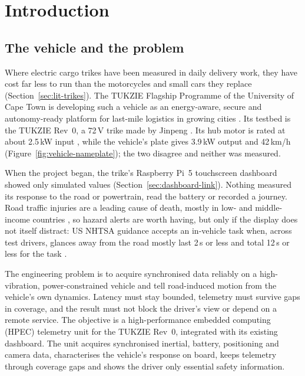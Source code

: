 \chapter{Introduction}
\label{chap:intro}

\section{The vehicle and the problem}

Where electric cargo trikes have been measured in daily delivery work, they have cost far less to run than the motorcycles and small cars they replace (Section~\ref{sec:lit-trikes}). The TUKZIE Flagship Programme of the University of Cape Town \cite{tukzie2026web} is developing such a vehicle as an energy-aware, secure and autonomy-ready platform \cite{winberg2026} for last-mile logistics in growing cities \cite{unwup2019}. Its testbed is the TUKZIE Rev~0, a 72\,V trike made by Jinpeng \cite{jinpengmanual}. Its hub motor is rated at about 2.5\,kW input \cite{adamsrasara2026}, while the vehicle's plate gives 3.9\,kW output and 42\,km/h (Figure~\ref{fig:vehicle-nameplate}); the two disagree and neither was measured.

When the project began, the trike's Raspberry Pi~5 touchscreen dashboard showed only simulated values (Section~\ref{sec:dashboard-link}). Nothing measured its response to the road or powertrain, read the battery or recorded a journey. Road traffic injuries are a leading cause of death, mostly in low- and middle-income countries \cite{who2023}, so hazard alerts are worth having, but only if the display does not itself distract: US NHTSA guidance accepts an in-vehicle task when, across test drivers, glances away from the road mostly last 2\,s or less and total 12\,s or less for the task \cite{nhtsa2013}.

The engineering problem \cite{winberg2026} is to acquire synchronised data reliably on a high-vibration, power-constrained vehicle and tell road-induced motion from the vehicle's own dynamics. Latency must stay bounded, telemetry must survive gaps in coverage, and the result must not block the driver's view or depend on a remote service. The objective is a high-performance embedded computing (HPEC) telemetry unit for the TUKZIE Rev~0, integrated with its existing dashboard. The unit acquires synchronised inertial, battery, positioning and camera data, characterises the vehicle's response on board, keeps telemetry through coverage gaps and shows the driver only essential safety information.

